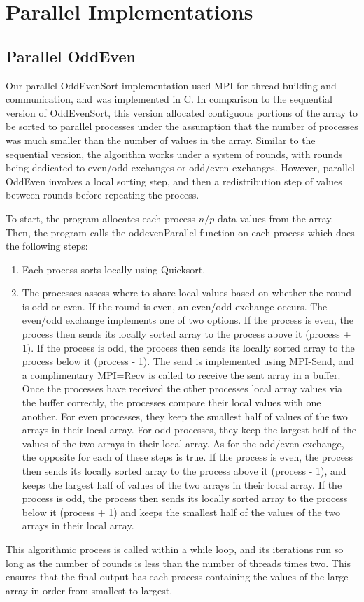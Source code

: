 \documentclass[11pt,twocolumn]{article}
\begin{document}
\section {Parallel Implementations}\label{relwork}
\subsection {Parallel OddEven}\label{soln}
Our  parallel  OddEvenSort  implementation  used MPI  for  thread  building  and  communication, and  was  implemented  in  C.  In comparison to the sequential version of OddEvenSort, this version allocated contiguous portions of the array to be sorted to parallel processes under the assumption that the number of processes was much smaller than the number of values in the array. Similar to the sequential version, the algorithm works under a system of rounds, with rounds being dedicated to even/odd exchanges or odd/even exchanges. However, parallel OddEven involves a local sorting step, and then a redistribution step of values between rounds before repeating the process.

To start, the program allocates each process $n/p$ data values from the array. Then, the program calls the oddevenParallel function on each process which does the following steps:
\begin{enumerate}
    \item Each process sorts locally using Quicksort.
    \item The processes assess where to share local values based on whether the round is odd or even. If the round is even, an even/odd exchange occurs. The even/odd exchange implements one of two options. If the process is even, the process then sends its locally sorted array to the process above it (process + 1). If the process is odd, the process then sends its locally sorted array to the process below it (process - 1). The send is implemented using MPI-Send, and a complimentary MPI=Recv is called to receive the sent array in a buffer. Once the processes have received the other processes local array values via the buffer correctly, the processes compare their local values with one another. For even processes, they keep the smallest half of values of the two arrays in their local array. For odd processes, they keep the largest half of the values of the two arrays in their local array. As for the odd/even exchange, the opposite for each of these steps is true. If the process is even, the process then sends its locally sorted array to the process above it (process - 1), and keeps the largest half of values of the two arrays in their local array. If the process is odd, the process then sends its locally sorted array to the process below it (process + 1) and keeps the smallest half of the values of the two arrays in their local array. 
\end{enumerate}
This algorithmic process is called within a while loop, and its iterations run so long as the number of rounds is less than the number of threads times two. This ensures that the final output has each process containing the values of the large array in order from smallest to largest.
\end{document}
